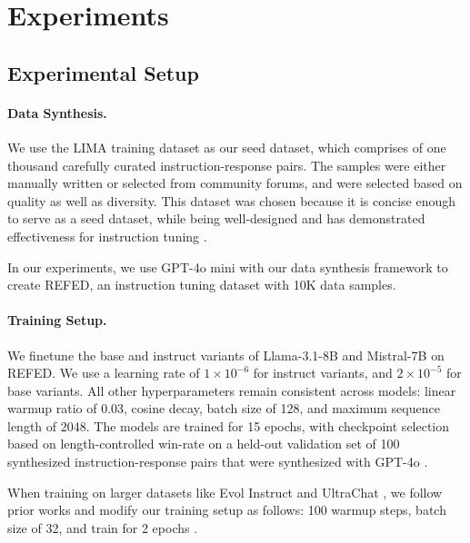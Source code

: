 



\section{Experiments}


\subsection{Experimental Setup}
\paragraph{Data Synthesis.} 

We use the LIMA \citep{lima} training dataset as our seed dataset, which comprises of one thousand carefully curated instruction-response pairs. The samples were either manually written or selected from community forums, and were selected based on quality as well as diversity. This dataset was chosen because it is concise enough to serve as a seed dataset, while being well-designed and has demonstrated effectiveness for instruction tuning \citep{lima}.

In our experiments, we use GPT-4o mini \citep{OpenAIGpt4oMini} with our data synthesis framework to create \textsc{REFED}, an instruction tuning dataset with 10K data samples.

\paragraph{Training Setup.}

We finetune the base and instruct variants of Llama-3.1-8B \citep{grattafiori2024llama3herdmodels} and Mistral-7B \citep{jiang2023mistral7b} on \textsc{REFED}. We use a learning rate of $1 \times 10^{-6}$ for instruct variants, and $2 \times 10^{-5}$ for base variants. All other hyperparameters remain consistent across models: linear warmup ratio of 0.03, cosine decay, batch size of 128, and maximum sequence length of 2048. The models are trained for 15 epochs, with checkpoint selection based on length-controlled win-rate \citep{dubois2024lengthcontrolledalpacaevalsimpleway} on a held-out validation set of 100 synthesized instruction-response pairs that were synthesized with GPT-4o \citep{openai2024gpt4ocard}. 

When training on larger datasets like Evol Instruct \citep{xu2023wizardlmempoweringlargelanguage} and UltraChat \citep{ding-etal-2023-enhancing}, we follow prior works and modify our training setup as follows: 100 warmup steps, batch size of 32, and train for 2 epochs \citep{xu2024magpiealignmentdatasynthesis}.



